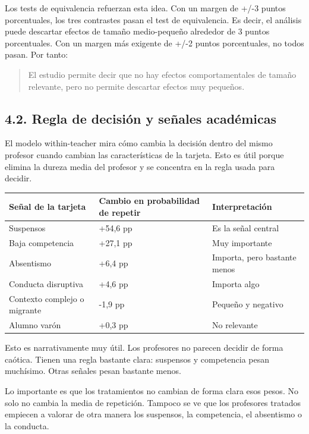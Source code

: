 \documentclass[12pt,a4paper]{article}
\newcommand{\pp}{puntos porcentuales}
\begin{document}
Los tests de equivalencia refuerzan esta idea. Con un margen de +/-3 \pp{}, los tres contrastes pasan el test de equivalencia. Es decir, el análisis puede descartar efectos de tamaño medio-pequeño alrededor de 3 \pp{}. Con un margen más exigente de +/-2 \pp{}, no todos pasan. Por tanto:

\begin{quote}
El estudio permite decir que no hay efectos comportamentales de tamaño relevante, pero no permite descartar efectos muy pequeños.
\end{quote}

\subsection*{4.2. Regla de decisión y señales académicas}

El modelo within-teacher mira cómo cambia la decisión dentro del mismo profesor cuando cambian las características de la tarjeta. Esto es útil porque elimina la dureza media del profesor y se concentra en la regla usada para decidir.

\begin{center}
\small
\begin{tabular}{L{0.30\textwidth}L{0.28\textwidth}L{0.28\textwidth}}
\toprule
Señal de la tarjeta & Cambio en probabilidad de repetir & Interpretación\\
\midrule
Suspensos & +54,6 pp & Es la señal central\\
Baja competencia & +27,1 pp & Muy importante\\
Absentismo & +6,4 pp & Importa, pero bastante menos\\
Conducta disruptiva & +4,6 pp & Importa algo\\
Contexto complejo o migrante & -1,9 pp & Pequeño y negativo\\
Alumno varón & +0,3 pp & No relevante\\
\bottomrule
\end{tabular}
\end{center}

Esto es narrativamente muy útil. Los profesores no parecen decidir de forma caótica. Tienen una regla bastante clara: suspensos y competencia pesan muchísimo. Otras señales pesan bastante menos.

Lo importante es que los tratamientos no cambian de forma clara esos pesos. No solo no cambia la media de repetición. Tampoco se ve que los profesores tratados empiecen a valorar de otra manera los suspensos, la competencia, el absentismo o la conducta.
\end{document}
